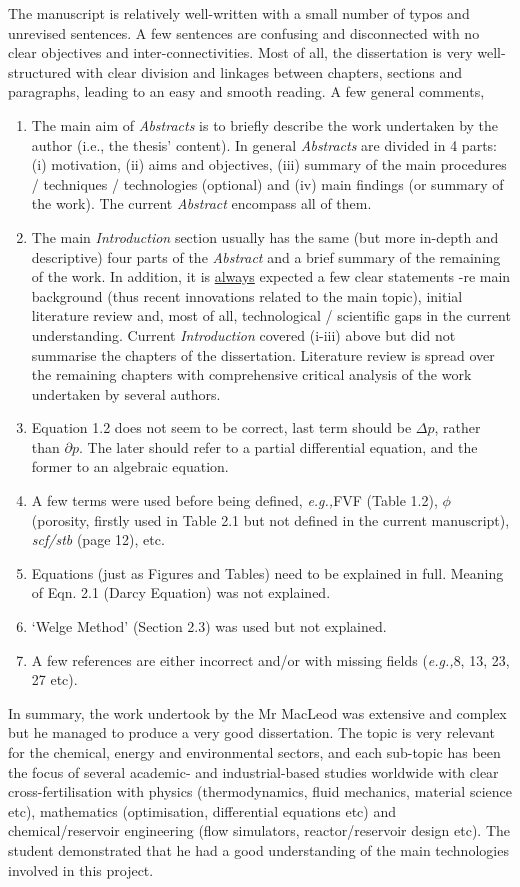 \documentclass[14pt,twoside]{report}
\newcommand{\eg}{{\it e.g.,}}
\begin{document}
\begin{description}
The manuscript is relatively well-written with a small number of typos and unrevised sentences. A few sentences are confusing and disconnected with no clear objectives and inter-connectivities. Most of all, the dissertation is very well-structured with clear division and linkages between chapters, sections and paragraphs, leading to an easy and smooth reading.  A few general comments,
\begin{enumerate}
%
\item The main aim of {\it Abstracts} is to briefly describe the work undertaken by the author (i.e., the thesis' content). In general {\it Abstracts} are divided in 4 parts: (i) motivation, (ii) aims and objectives, (iii) summary of the main procedures / techniques / technologies (optional) and (iv) main findings (or summary of the work). The current {\it Abstract} encompass all of them.
%
\item The main {\it Introduction} section usually has the same (but more in-depth and descriptive) four parts of the {\it Abstract} and a brief summary of the remaining of the work. In addition, it is \underline{always} expected a few clear statements -re main background (thus recent innovations related to the main topic), initial literature review and, most of all, technological / scientific gaps in the current understanding. Current {\it Introduction} covered (i-iii) above but did not summarise the chapters of the dissertation. Literature review is spread over the remaining chapters with comprehensive critical analysis of the work undertaken by several authors. 
%
\item Equation 1.2 does not seem to be correct, last term should be $\Delta p$, rather than $\partial p$. The later should refer to a partial differential equation, and the former to an algebraic equation.
%
\item A few terms were used before being defined, \eg FVF (Table 1.2), $\phi$ (porosity, firstly used in Table 2.1 but not defined in the current manuscript), {\it scf/stb} (page 12), etc.
%
\item Equations (just as Figures and Tables) need to be explained in full. Meaning of Eqn. 2.1 (Darcy Equation) was not explained.
%
\item `Welge Method' (Section 2.3) was used but not explained.
%
\item A few references are either incorrect and/or with missing fields (\eg 8, 13, 23, 27 etc).
% 
\end{enumerate}
In summary, the work undertook by the Mr MacLeod was extensive and complex but he managed to produce a very good dissertation. The topic is very relevant for the chemical, energy and environmental sectors, and each sub-topic has been the focus of several academic- and industrial-based studies worldwide with clear cross-fertilisation with physics (thermodynamics, fluid mechanics, material science etc), mathematics (optimisation, differential equations etc) and chemical/reservoir engineering (flow simulators, reactor/reservoir design etc). The student demonstrated that he had a good understanding of the main technologies involved in this project.


\end{description}
\end{document}
